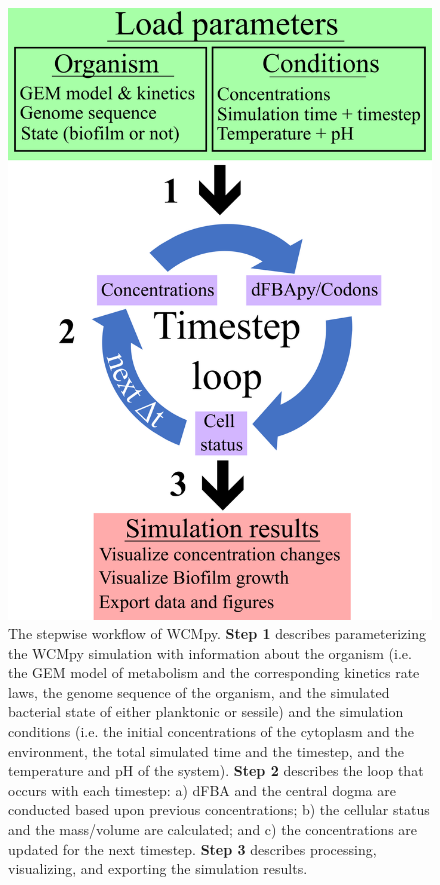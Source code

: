 \begin{figure}
    \centering
    \includegraphics{images/WCMpy/wcmpy_workflow.png}
    \caption{
        The stepwise workflow of WCMpy. \textbf{Step 1} describes parameterizing the WCMpy simulation with information about the organism (i.e. the GEM model of metabolism and the corresponding kinetics rate laws, the genome sequence of the organism, and the simulated bacterial state of either planktonic or sessile) and the simulation conditions (i.e. the initial concentrations of the cytoplasm and the environment, the total simulated time and the timestep, and the temperature and pH of the system). \textbf{Step 2} describes the loop that occurs with each timestep: a) dFBA and the central dogma are conducted based upon previous concentrations; b) the cellular status and the mass/volume are calculated; and c) the concentrations are updated for the next timestep. \textbf{Step 3} describes processing, visualizing, and exporting the simulation results. 
    }
    \label{wcmpy_workflow}
\end{figure}

